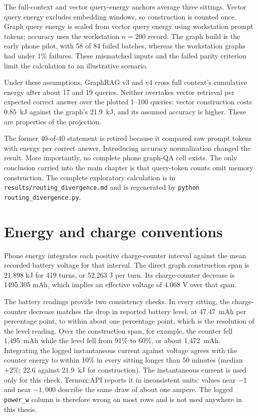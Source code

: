 The full-context and vector query-energy anchors average three sittings. Vector query
energy excludes embedding windows, so construction is counted once. Graph query energy
is scaled from vector query energy using workstation prompt tokens; accuracy uses the
workstation $n=200$ record. The graph build is the early phone pilot, with 58 of 84 failed
batches, whereas the workstation graphs had under 1\% failures. These mismatched inputs
and the failed parity criterion limit the calculation to an illustrative scenario.

Under these assumptions, GraphRAG v3 and v4 cross full context's cumulative energy after
about 17 and 19 queries. Neither overtakes vector retrieval per expected correct answer
over the plotted 1--100 queries: vector construction costs 0.85~kJ against the graph's
21.9~kJ, and its assumed accuracy is higher. These are properties of the projection.

The former 40-of-40 statement is retired because it compared raw prompt tokens with
energy per correct answer. Introducing accuracy normalization changed the result. More
importantly, no complete phone graph-QA cell exists. The only conclusion carried into
the main chapter is that query-token counts omit memory construction. The complete
exploratory calculation is in \texttt{results/routing\_divergence.md} and is regenerated
by \texttt{python routing\_divergence.py}.

\section{Energy and charge conventions}
\label{app:ch5_energy_conventions}

Phone energy integrates each positive charge-counter interval against the mean recorded
battery voltage for that interval. The direct graph construction span is 21.898 kJ for
419 turns, or 52.263 J per turn. Its charge-counter decrease is 1495.305 mAh, which
implies an effective voltage of 4.068 V over that span.

The battery readings provide two consistency checks. In every sitting, the charge-counter
decrease matches the drop in reported battery level, at 47.47~mAh per percentage point, to within
about one percentage point, which is the resolution of the level reading. Over the construction
span, for example, the counter fell 1,495~mAh while the level fell from 91\% to 60\%, or about
1,472~mAh. Integrating the logged instantaneous current against voltage
agrees with the counter energy to within 10\% in every sitting longer than 50 minutes (median
$+2\%$; 22.6 against 21.9~kJ for construction). The instantaneous current is used only for this
check. Termux:API reports it in inconsistent units: values near $-1$ and near $-1{,}000$ describe
the same draw of about one ampere. The logged \texttt{power\_w} column is therefore wrong on most
rows and is not used anywhere in this thesis.

